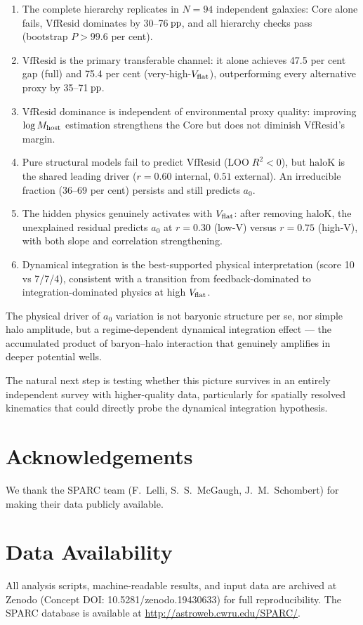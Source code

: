\documentclass[fleqn,usenatbib]{mnras}
\newcommand{\azero}{a_0}
\newcommand{\vflat}{V_{\rm flat}}
\newcommand{\vfresid}{\mathrm{VfResid}}
\newcommand{\haloK}{\mathrm{haloK}}
\newcommand{\mhost}{M_{\rm host}}
\newcommand{\loo}{\mathrm{LOO}}
\newcommand{\pp}{{\rm pp}}
\begin{document}
\begin{enumerate}
\item The complete hierarchy replicates in $N = 94$ independent galaxies:
  Core alone fails, $\vfresid$ dominates by 30--76$\,\pp$, and all
  hierarchy checks pass (bootstrap $P > 99.6$ per cent).
\item $\vfresid$ is the primary transferable channel: it alone achieves
  47.5 per cent gap (full) and 75.4 per cent (very-high-$\vflat$),
  outperforming every alternative proxy by 35--71$\,\pp$.
\item $\vfresid$ dominance is independent of environmental proxy quality:
  improving $\log \mhost$ estimation strengthens the Core but does not
  diminish $\vfresid$'s margin.
\item Pure structural models fail to predict $\vfresid$ ($\loo\;R^2 < 0$),
  but $\haloK$ is the shared leading driver ($r = 0.60$ internal,
  $0.51$ external). An irreducible fraction (36--69 per cent) persists
  and still predicts $\azero$.
\item The hidden physics genuinely activates with $\vflat$: after removing
  $\haloK$, the unexplained residual predicts $\azero$ at
  $r = 0.30$ (low-V) versus $r = 0.75$ (high-V), with both slope and
  correlation strengthening.
\item Dynamical integration is the best-supported physical interpretation
  (score 10 vs 7/7/4), consistent with a transition from
  feedback-dominated to integration-dominated physics at high $\vflat$.
\end{enumerate}

The physical driver of $\azero$ variation is not baryonic structure per se,
nor simple halo amplitude, but a regime-dependent dynamical integration
effect --- the accumulated product of baryon--halo interaction that
genuinely amplifies in deeper potential wells.

The natural next step is testing whether this picture survives in an
entirely independent survey with higher-quality data, particularly for
spatially resolved kinematics that could directly probe the dynamical
integration hypothesis.

\section*{Acknowledgements}

We thank the SPARC team (F.~Lelli, S.~S.~McGaugh, J.~M.~Schombert) for
making their data publicly available.

\section*{Data Availability}

All analysis scripts, machine-readable results, and input data are archived
at Zenodo (Concept DOI: 10.5281/zenodo.19430633) for full reproducibility.
The SPARC database is available at
\url{http://astroweb.cwru.edu/SPARC/}.




\bsp
\label{lastpage}
\end{document}
